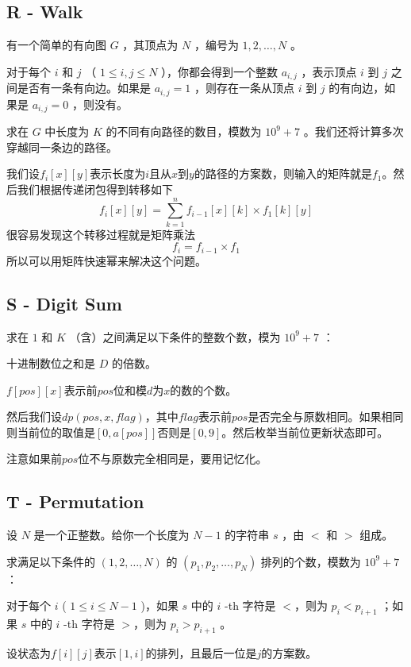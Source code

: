 \subsection{R - Walk}
\begin{framed}
    有一个简单的有向图 $G$ ，其顶点为 $N$ ，编号为 $1, 2, \ldots, N$ 。

    对于每个 $i$ 和 $j$ （ $1 \leq i, j \leq N$ ），你都会得到一个整数 $a_{i, j}$ ，表示顶点 $i$ 到 $j$ 之间是否有一条有向边。如果是 $a_{i, j} = 1$ ，则存在一条从顶点 $i$ 到 $j$ 的有向边，如果是 $a_{i, j} = 0$ ，则没有。

    求在 $G$ 中长度为 $K$ 的不同有向路径的数目，模数为 $10^9 + 7$ 。我们还将计算多次穿越同一条边的路径。
\end{framed}

我们设$f_i[x][y]$表示长度为$i$且从$x$到$y$的路径的方案数，则输入的矩阵就是$f_1$。然后我们根据传递闭包得到转移如下
\[
    f_i[x][y] = \sum_{k=1}^n f_{i-1}[x][k] \times f_1[k][y]
\]
很容易发现这个转移过程就是矩阵乘法
\[
    f_i = f_{i-1}\times f_1
\]
所以可以用矩阵快速幂来解决这个问题。


\subsection{S - Digit Sum}
\begin{framed}
    求在 $1$ 和 $K$ （含）之间满足以下条件的整数个数，模为 $10^9 + 7$ ：

    十进制数位之和是 $D$ 的倍数。
\end{framed}
$f[pos][x]$表示前$pos$位和模$d$为$x$的数的个数。

然后我们设$dp(pos,x,flag)$，其中$flag$表示前$pos$是否完全与原数相同。如果相同则当前位的取值是$[0,a[pos]]$否则是$[0,9]$。然后枚举当前位更新状态即可。

注意如果前$pos$位不与原数完全相同是，要用记忆化。


\subsection{T - Permutation}
\begin{framed}
    设 $N$ 是一个正整数。给你一个长度为 $N - 1$ 的字符串 $s$ ，由 $<$ 和 $>$ 组成。

    求满足以下条件的 $(1, 2, \ldots, N)$ 的 $(p_1, p_2, \ldots, p_N)$ 排列的个数，模数为 $10^9 + 7$ ：

    对于每个 $i$ ( $1 \leq i \leq N - 1$ )，如果 $s$ 中的 $i$ -th 字符是 $<$，则为 $p_i \lt p_{i + 1}$ ；如果 $s$ 中的 $i$ -th 字符是 $>$，则为 $p_i \gt p_{i + 1}$ 。
\end{framed}
设状态为$f[i][j]$表示$[1,i]$的排列，且最后一位是$j$的方案数。

